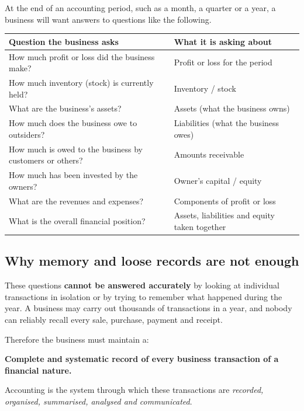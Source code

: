 \documentclass[11pt,a4paper]{article}
\begin{document}
At the end of an accounting period, such as a month, a quarter or a year, a business will want
answers to questions like the following.

\begin{center}
\small
\begin{tabularx}{\textwidth}{@{}Y Y@{}}
\toprule
{}\textbf{Question the business asks} & \textbf{What it is asking about}\\
\midrule
How much profit or loss did the business make? & Profit or loss for the period\\
How much inventory (stock) is currently held? & Inventory / stock\\
What are the business's assets? & Assets (what the business owns)\\
How much does the business owe to outsiders? & Liabilities (what the business owes)\\
How much is owed to the business by customers or others? & Amounts receivable\\
How much has been invested by the owners? & Owner's capital / equity\\
What are the revenues and expenses? & Components of profit or loss\\
What is the overall financial position? & Assets, liabilities and equity taken together\\
\bottomrule
\end{tabularx}
\end{center}

\subsection{Why memory and loose records are not enough}

These questions \textbf{cannot be answered accurately} by looking at individual transactions
in isolation or by trying to remember what happened during the year. A business may carry out
thousands of transactions in a year, and nobody can reliably recall every sale, purchase,
payment and receipt.

Therefore the business must maintain a:

\begin{keybox}
\textbf{Complete and systematic record of every business transaction of a financial nature.}

Accounting is the system through which these transactions are \emph{recorded, organised,
summarised, analysed and communicated}.
\end{keybox}
\end{document}
